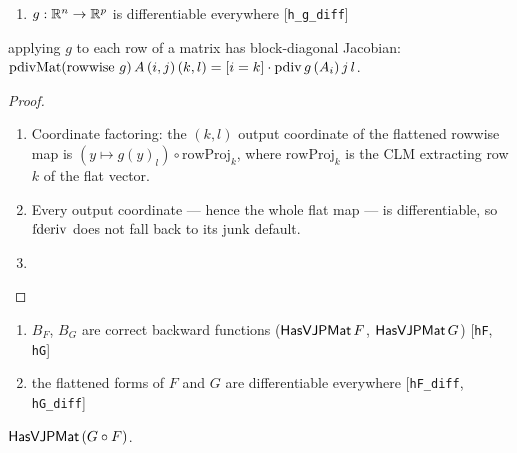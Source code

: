 \begin{theorem}
  \label{ax:pdivMat_rowIndep}
  \leanok
  \Assume{}
  \begin{enumerate}
    \item \(g : \mathbb{R}^{n} \to \mathbb{R}^{p}\) is differentiable everywhere
          \hfill[\texttt{h\_g\_diff}]
  \end{enumerate}
  \Prove{} applying \(g\) to each row of a matrix has block-diagonal
  Jacobian:
  \(\operatorname{pdivMat}(\text{rowwise } g)\, A\, (i,j)\, (k,l)
    = [i = k] \cdot \operatorname{pdiv} g\, (A_i)\, j\, l\).
\end{theorem}

\begin{proof}
\leanok
\begin{enumerate}
  \item Coordinate factoring: the \((k, l)\) output coordinate of the
    flattened rowwise map is
    \((y \mapsto g(y)_l) \circ \mathrm{rowProj}_k\), where
    \(\mathrm{rowProj}_k\) is the CLM extracting row \(k\) of the
    flat vector.
  \item Every output coordinate --- hence the whole flat map --- is
    differentiable, so \(\operatorname{fderiv}\) does not fall back to its junk
    default.
  \item \Qed{}
\end{enumerate}
\end{proof}

\begin{theorem}
  \label{thm:vjpMatComp}
  \leanok
  \Assume{}
  \begin{enumerate}
    \item \(B_F\), \(B_G\) are correct backward functions
          (\(\mathsf{HasVJPMat}\, F\), \(\mathsf{HasVJPMat}\, G\))
          \hfill[\texttt{hF}, \texttt{hG}]
    \item the flattened forms of \(F\) and \(G\) are differentiable
          everywhere \hfill[\texttt{hF\_diff}, \texttt{hG\_diff}]
  \end{enumerate}
  \Prove{} \(\mathsf{HasVJPMat}\, (G \circ F)\).
\end{theorem}

